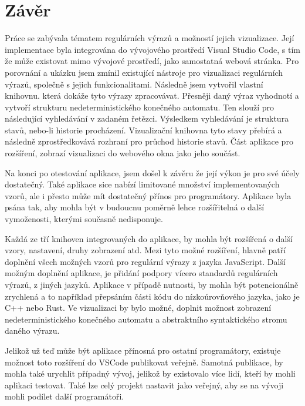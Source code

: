 \chapter{Závěr}\label{sec:Conclusion}

Práce se zabývala tématem regulárních výrazů a možností jejich vizualizace.
Její implementace byla integrována do vývojového prostředí Visual Studio Code, s tím že může existovat mimo vývojové prostředí, jako samostatná webová stránka.
Pro porovnání a ukázku jsem zmínil existující nástroje pro vizualizaci regulárních výrazů, společně s jejich funkcionalitami.
Následně jsem vytvořil vlastní knihovnu. která dokáže tyto výrazy zpracovávat.
Přesněji daný výraz vyhodnotí a vytvoří strukturu nedeterministického konečného automatu.
Ten slouží pro následující vyhledávání v zadaném řetězci.
Výsledkem vyhledávání je struktura stavů, nebo-li historie procházení.
Vizualizační knihovna tyto stavy přebírá a následně zprostředkovává rozhraní pro průchod historie stavů.
Část aplikace pro rozšíření, zobrazí vizualizaci do webového okna jako jeho součást.

Na konci po otestování aplikace, jsem došel k závěru že její výkon je pro své účely dostatečný.
Také aplikace sice nabízí limitované množství implementovaných vzorů, ale i přesto může mít dostatečný přínos pro programátory.
Aplikace byla psána tak, aby mohla být v budoucnu poměrně lehce rozšířitelná o další vymoženosti, kterými současně nedisponuje.

Každá ze tří knihoven integrovaných do aplikace, by mohla být rozšířená o další vzory, nastavení, druhy zobrazení atd.
Mezi tyto možné rozšíření, hlavně patří doplnění všech možných vzorů pro regulární výrazy z jazyka JavaScript.
Další možným doplnění aplikace, je přidání podpory vícero standardů regulárních výrazů, z jiných jazyků.
Aplikace v případě nutnosti, by mohla být potencionálně zrychlená a to například přepsáním části kódu do nízkoúrovňového jazyka, jako je C++ nebo Rust.
Ve vizualizaci by bylo možné, doplnit možnost zobrazení nedeterministického konečného automatu a abstraktního syntaktického stromu daného výrazu.

Jelikož už teď může být aplikace přínosná pro ostatní programátory, existuje možnost toto rozšíření do VSCode publikovat veřejně.
Samotná publikace, by mohla také urychlit případný vývoj, jelikož by existovalo více lidí, kteří by mohli aplikaci testovat.
Také lze celý projekt nastavit jako veřejný, aby se na vývoji mohli podílet další programátoři.